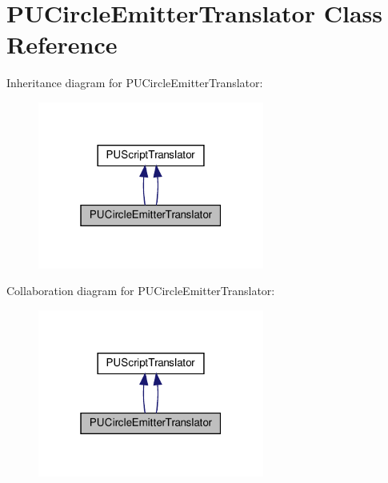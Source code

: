 \hypertarget{classPUCircleEmitterTranslator}{}\section{P\+U\+Circle\+Emitter\+Translator Class Reference}
\label{classPUCircleEmitterTranslator}


Inheritance diagram for P\+U\+Circle\+Emitter\+Translator\+:
\nopagebreak
\begin{figure}[H]
\begin{center}
\leavevmode
\includegraphics[width=211pt]{classPUCircleEmitterTranslator__inherit__graph}
\end{center}
\end{figure}


Collaboration diagram for P\+U\+Circle\+Emitter\+Translator\+:
\nopagebreak
\begin{figure}[H]
\begin{center}
\leavevmode
\includegraphics[width=211pt]{classPUCircleEmitterTranslator__coll__graph}
\end{center}
\end{figure}
